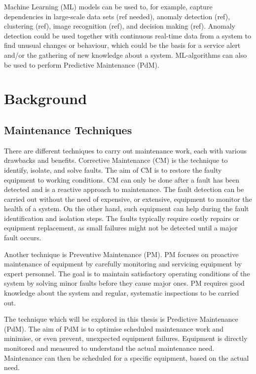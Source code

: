 Machine Learning (ML) models can be used to, for example, capture dependencies in large-scale data sets (ref needed), anomaly detection (ref), clustering (ref), image recognition (ref), and decision making (ref). 
Anomaly detection could be used together with continuous real-time data from a system to find unusual changes or behaviour, which could be the basis for a service alert and/or the gathering of new knowledge about a system.
ML-algorithms can also be used to perform Predictive Maintenance (PdM).

\section{Background}

\subsection{Maintenance Techniques}
There are different techniques to carry out maintenance work, each with various drawbacks and benefits.
Corrective Maintenance (CM) is the technique to identify, isolate, and solve faults.
The aim of CM is to restore the faulty equipment to working conditions.
CM can only be done after a fault has been detected and is a reactive approach to maintenance.
The fault detection can be carried out without the need of expensive, or extensive, equipment to monitor the health of a system.
On the other hand, such equipment can help during the fault identification and isolation steps. 
The faults typically require costly repairs or equipment replacement, as small failures might not be detected until a major fault occurs.

Another technique is Preventive Maintenance (PM).
PM focuses on proactive maintenance of equipment by carefully monitoring and servicing equipment by expert personnel.
The goal is to maintain satisfactory operating conditions of the system by solving minor faults before they cause major ones.
PM requires good knowledge about the system and regular, systematic inspections to be carried out.

The technique which will be explored in this thesis is Predictive Maintenance (PdM).
The aim of PdM is to optimise scheduled maintenance work and minimise, or even prevent, unexpected equipment failures.
Equipment is directly monitored and measured to understand the actual maintenance need.
Maintenance can then be scheduled for a specific equipment, based on the actual need.

